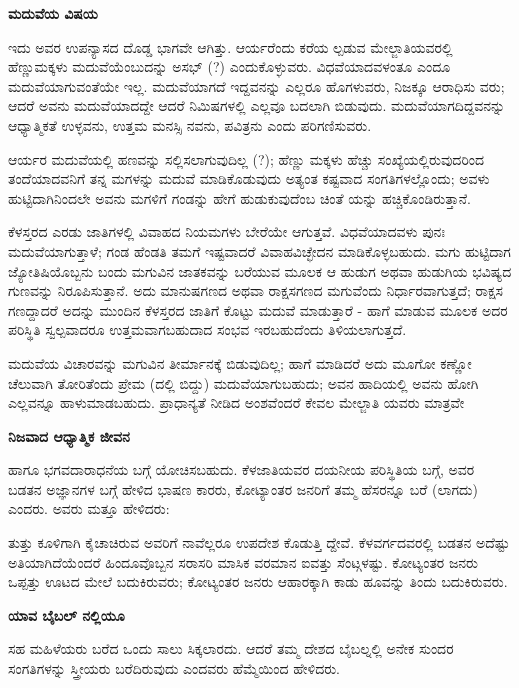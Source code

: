 \begin{center}
\textbf{ಮದುವೆಯ ವಿಷಯ}
\end{center}

ಇದು ಅವರ ಉಪನ್ಯಾಸದ ದೊಡ್ಡ ಭಾಗವೇ ಆಗಿತ್ತು. ಆರ್ಯರೆಂದು ಕರೆಯ ಲ್ಪಡುವ ಮೇಲ್ಜಾತಿಯವರಲ್ಲಿ ಹೆಣ್ಣುಮಕ್ಕಳು ಮದುವೆಯೆಂಬುದನ್ನು ಅಸಭ್ (?) ಎಂದುಕೊಳ್ಳುವರು. ವಿಧವೆಯಾದವಳಂತೂ ಎಂದೂ ಮದುವೆಯಾಗುವಂತೆಯೇ ಇಲ್ಲ. ಮದುವೆಯಾಗದೆ ಇದ್ದವನನ್ನು ಎಲ್ಲರೂ ಹೊಗಳುವರು, ನಿಜಕ್ಕೂ ಆರಾಧಿಸು ವರು; ಆದರೆ ಅವನು ಮದುವೆಯಾದದ್ದೇ ಆದರೆ ನಿಮಿಷಗಳಲ್ಲಿ ಎಲ್ಲವೂ ಬದಲಾಗಿ ಬಿಡುವುದು. ಮದುವೆಯಾಗದಿದ್ದವನನ್ನು ಆಧ್ಯಾತ್ಮಿಕತೆ ಉಳ್ಳವನು, ಉತ್ತಮ ಮನಸ್ಸಿ ನವನು, ಪವಿತ್ರನು ಎಂದು ಪರಿಗಣಿಸುವರು.

ಆರ್ಯರ ಮದುವೆಯಲ್ಲಿ ಹಣವನ್ನು ಸಲ್ಲಿಸಲಾಗುವುದಿಲ್ಲ (?); ಹೆಣ್ಣು ಮಕ್ಕಳು ಹೆಚ್ಚು ಸಂಖ್ಯೆಯಲ್ಲಿರುವುದರಿಂದ ತಂದೆಯಾದವನಿಗೆ ತನ್ನ ಮಗಳನ್ನು ಮದುವೆ ಮಾಡಿಕೊಡುವುದು ಅತ್ಯಂತ ಕಷ್ಟವಾದ ಸಂಗತಿಗಳಲ್ಲೊಂದು; ಅವಳು ಹುಟ್ಟಿದಾಗಿನಿಂದಲೇ ಅವನು ಮಗಳಿಗೆ ಗಂಡನ್ನು ಹೇಗೆ ಹುಡುಕುವುದೆಂಬ ಚಿಂತೆ ಯನ್ನು ಹಚ್ಚಿಕೊಂಡಿರುತ್ತಾನೆ.

ಕೆಳಸ್ತರದ ಎರಡು ಜಾತಿಗಳಲ್ಲಿ ವಿವಾಹದ ನಿಯಮಗಳು ಬೇರೆಯೇ ಆಗುತ್ತವೆ. ವಿಧವೆಯಾದವಳು ಪುನಃ ಮದುವೆಯಾಗುತ್ತಾಳೆ; ಗಂಡ ಹೆಂಡತಿ ತಮಗೆ ಇಷ್ಟವಾದರೆ ವಿವಾಹವಿಚ್ಛೇದನ ಮಾಡಿಕೊಳ್ಳಬಹುದು. ಮಗು ಹುಟ್ಟಿದಾಗ ಜ್ಯೋತಿಷಿಯೊಬ್ಬನು ಬಂದು ಮಗುವಿನ ಜಾತಕವನ್ನು ಬರೆಯುವ ಮೂಲಕ ಆ ಹುಡುಗ ಅಥವಾ ಹುಡುಗಿಯ ಭವಿಷ್ಯದ ಗುಣವನ್ನು ನಿರೂಪಿಸುತ್ತಾನೆ. ಅದು ಮಾನುಷಗಣದ ಅಥವಾ ರಾಕ್ಷಸಗಣದ ಮಗುವೆಂದು ನಿರ್ಧಾರವಾಗುತ್ತದೆ; ರಾಕ್ಷಸ ಗಣದ್ದಾದರೆ ಅದನ್ನು ಮುಂದಿನ ಕೆಳಸ್ತರದ ಜಾತಿಗೆ ಕೊಟ್ಟು ಮದುವೆ ಮಾಡುತ್ತಾರೆ - ಹಾಗೆ ಮಾಡುವ ಮೂಲಕ ಅದರ ಪರಿಸ್ಥಿತಿ ಸ್ವಲ್ಪವಾದರೂ ಉತ್ತಮವಾಗಬಹುದಾದ ಸಂಭವ ಇರಬಹುದೆಂದು ತಿಳಿಯಲಾಗುತ್ತದೆ.

ಮದುವೆಯ ವಿಚಾರವನ್ನು ಮಗುವಿನ ತೀರ್ಮಾನಕ್ಕೆ ಬಿಡುವುದಿಲ್ಲ; ಹಾಗೆ ಮಾಡಿದರೆ ಅದು ಮೂಗೋ ಕಣ್ಣೋ ಚೆಲುವಾಗಿ ತೋರಿತೆಂದು ಪ್ರೇಮ (ದಲ್ಲಿ ಬಿದ್ದು) ಮದುವೆಯಾಗುಬಹುದು; ಅವನ ಹಾದಿಯಲ್ಲಿ ಅವನು ಹೋಗಿ ಎಲ್ಲವನ್ನೂ ಹಾಳುಮಾಡಬಹುದು. ಪ್ರಾಧಾನ್ಯತೆ ನೀಡಿದ ಅಂಶವೆಂದರೆ ಕೇವಲ ಮೇಲ್ಜಾತಿ ಯವರು ಮಾತ್ರವೇ

\begin{center}
\textbf{ನಿಜವಾದ ಆಧ್ಯಾತ್ಮಿಕ ಜೀವನ}
\end{center}

ಹಾಗೂ ಭಗವದಾರಾಧನೆಯ ಬಗ್ಗೆ ಯೋಚಿಸಬಹುದು. ಕೆಳಜಾತಿಯವರ ದಯನೀಯ ಪರಿಸ್ಥಿತಿಯ ಬಗ್ಗೆ, ಅವರ ಬಡತನ ಅಜ್ಞಾನಗಳ ಬಗ್ಗೆ ಹೇಳಿದ ಭಾಷಣ ಕಾರರು, ಕೋಟ್ಯಾಂತರ ಜನರಿಗೆ ತಮ್ಮ ಹೆಸರನ್ನೂ ಬರೆ (ಲಾಗದು) ಎಂದರು. ಅವರು ಮತ್ತೂ ಹೇಳಿದರು:

ತುತ್ತು ಕೂಳಿಗಾಗಿ ಕೈಚಾಚಿರುವ ಅವರಿಗೆ ನಾವೆಲ್ಲರೂ ಉಪದೇಶ ಕೊಡುತ್ತಿ ದ್ದೇವೆ. ಕೆಳವರ್ಗದವರಲ್ಲಿ ಬಡತನ ಅದೆಷ್ಟು ಅತಿಯಾಗಿದೆಯೆಂದರೆ ಹಿಂದೂವೊಬ್ಬನ ಸರಾಸರಿ ಮಾಸಿಕ ವರಮಾನ ಐವತ್ತು ಸೆಂಟ್ಗಳಷ್ಟು. ಕೋಟ್ಯಂತರ ಜನರು ಒಪ್ಪತ್ತು ಊಟದ ಮೇಲೆ ಬದುಕಿರುವರು; ಕೋಟ್ಯಂತರ ಜನರು ಆಹಾರಕ್ಕಾಗಿ ಕಾಡು ಹೂವನ್ನು ತಿಂದು ಬದುಕಿರುವರು.

\begin{center}
\textbf{ಯಾವ ಬೈಬಲ್ ನಲ್ಲಿಯೂ}
\end{center}

ಸಹ ಮಹಿಳೆಯರು ಬರೆದ ಒಂದು ಸಾಲು ಸಿಕ್ಕಲಾರದು. ಆದರೆ ತಮ್ಮ ದೇಶದ ಬೈಬಲ್ನಲ್ಲಿ ಅನೇಕ ಸುಂದರ ಸಂಗತಿಗಳನ್ನು ಸ್ತ್ರೀಯರು ಬರೆದಿರುವುದು ಎಂದವರು ಹೆಮ್ಮೆಯಿಂದ ಹೇಳಿದರು.

